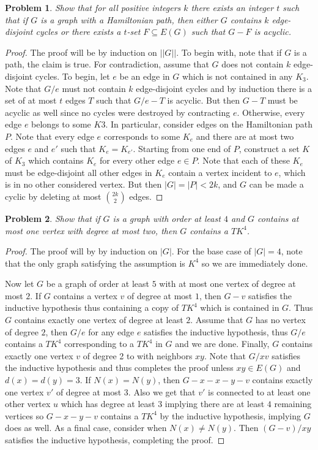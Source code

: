 \documentclass[12pt]{article}
\newtheorem{problem}{Problem}
\begin{document}
\begin{problem} Show that for all positive integers $k$ there exists
  an integer $t$ such that if $G$ is a graph with a Hamiltonian path,
  then either $G$ contains $k$ edge-disjoint cycles or there exists a
  $t$-set $F \subseteq E(G)$ such that $G-F$ is acyclic.
\end{problem}
\begin{proof} The proof will be by induction on $||G||$. To begin
  with, note that if $G$ is a path, the claim is true. For
  contradiction, assume that $G$ does not contain $k$ edge-disjoint
  cycles. To begin, let $e$ be an edge in $G$ which is not contained
  in any $K_3$. Note that $G/e$ must not contain $k$ edge-disjoint
  cycles and by induction there is a set of at most $t$ edges $T$ such
  that $G/e - T$ is acyclic. But then $G-T$ must be acyclic as well
  since no cycles were destroyed by contracting $e$. Otherwise, every
  edge $e$ belongs to some $K3$. In particular, consider edges on the
  Hamiltonian path $P$. Note that every edge $e$ corresponds to some
  $K_e$ and there are at most two edges $e$ and $e'$ such that
  $K_e = K_{e'}$. Starting from one end of $P$, construct a set $K$ of
  $K_3$ which contains $K_e$ for every other edge $e \in P$. Note that
  each of these $K_e$ must be edge-disjoint all other edges in $K_e$
  contain a vertex incident to $e$, which is in no other considered
  vertex. But then $|G| = |P| < 2k$, and $G$ can be made a cyclic by
  deleting at most ${2k \choose 2}$ edges.
\end{proof}
\begin{problem} Show that if $G$ is a graph with order at least $4$
  and $G$ contains at most one vertex with degree at most two, then
  $G$ contains a $TK^4$.
\end{problem}
\begin{proof} The proof will by by induction on $|G|$. For the base
  case of $|G|=4$, note that the only graph satisfying the assumption
  is $K^4$ so we are immediately done.

  Now let $G$ be a graph of order at least $5$ with at most one vertex
  of degree at most $2$. If $G$ contains a vertex $v$ of degree at
  most $1$, then $G-v$ satisfies the inductive hypothesis thus
  containing a copy of $TK^4$ which is contained in $G$. Thus $G$
  contains exactly one vertex of degree at least $2$. Assume that $G$
  has no vertex of degree $2$, then $G/e$ for any edge $e$ satisfies
  the inductive hypothesis, thus $G/e$ contains a $TK^4$ corresponding
  to a $TK^4$ in $G$ and we are done. Finally, $G$ contains exactly
  one vertex $v$ of degree 2 to with neighbors $xy$. Note that $G/xv$
  satisfies the inductive hypothesis and thus completes the proof
  unless $xy \in E(G)$ and $d(x) = d(y) = 3$. If $N(x) = N(y)$, then
  $G - x - x - y - v$ contains exactly one vertex $v'$ of degree at
  most $3$. Also we get that $v'$ is connected to at least one other
  vertex $u$ which has degree at least $3$ implying there are at least
  $4$ remaining vertices so $G - x - y - v$ contains a $TK^4$ by the
  inductive hypothesis, implying $G$ does as well. As a final case,
  consider when $N(x) \neq N(y)$. Then $(G - v)/xy$ satisfies the
  inductive hypothesis, completing the proof.
\end{proof}
\end{document}

